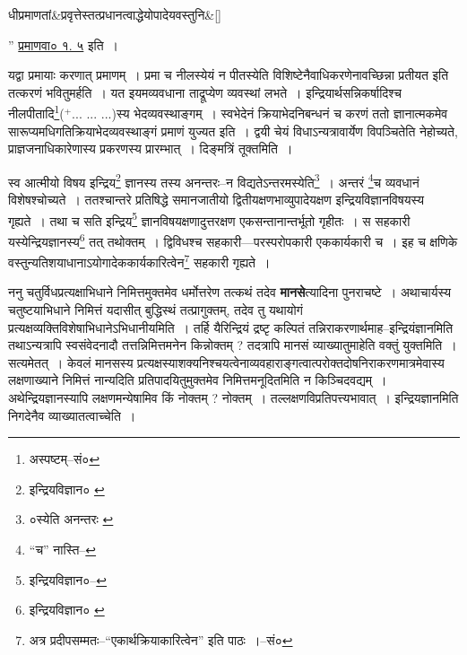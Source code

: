 \documentclass[article,12pt,a4paper]{memoir}
\newcommand{\add}[1]{($^{+}$#1)}
\begin{document}
	    
	    \stanza[\smallbreak]
	धीप्रमाणतां&प्रवृत्तेस्तत्प्रधानत्वाद्धेयोपादेयवस्तुनि\&[\smallbreak]


	
	    \pstart
	  ” \href{http://http://sarit.indology.info/?cref=pv.1.5}{प्रमाणवा० १. ५} इति ।
	\pend
      

	  \pstart यद्वा प्रमायाः करणात् प्रमाणम् । प्रमा च नीलस्येयं न पीतस्येति विशिष्टेनैवाधिकरणेनावच्छिन्ना प्रतीयत इति तत्करणं भवितुमर्हति । यत इयमव्यवधाना ताद्रूप्येण व्यवस्थां लभते । इन्द्रियार्थसन्निकर्षादिश्च नीलपीतादि\footnote{अस्पष्टम्--सं०}\add{... ... ...}स्य भेदव्यवस्थाङ्गम् । स्वभेदेनं क्रियाभेदनिबन्धनं च करणं ततो ज्ञानात्मकमेव सारूप्यमधिगतिक्रियाभेदव्यवस्थाङ्गं प्रमाणं युज्यत इति । द्वयी चेयं विधाऽन्यत्रावार्येण विपञ्चितेति नेहोच्यते, प्राज्ञजनाधिकारेणास्य प्रकरणस्य प्रारम्भात् । दिङ्मत्रिं तूक्तमिति ।
	\pend
	  \bigskip
	  \begingroup
	

	  \pstart स्व आत्मीयो विषय इन्द्रिय\footnote{इन्द्रियविज्ञान० \cite{dp-msB}} ज्ञानस्य तस्य अनन्तरः--न विद्यतेऽन्तरमस्येति\footnote{०स्येति अनन्तरः \cite{dp-msB} \cite{dp-msD}} । अन्तरं \footnote{“च” नास्ति--\cite{dp-msC}}\-च व्यवधानं विशेषश्चोच्यते । ततश्चान्तरे प्रतिषिद्धे समानजातीयो द्वितीयक्षणभाव्युपादेयक्षण इन्द्रियविज्ञानविषयस्य गृह्यते । तथा च सति इन्द्रिय\footnote{इन्द्रियविज्ञान०--\cite{dp-msC}} ज्ञानविषयक्षणादुत्तरक्षण एकसन्तानान्तर्भूतो गृहीतः । स सहकारी यस्येन्द्रियज्ञानस्य\footnote{इन्द्रियविज्ञान० \cite{dp-msA} \cite{dp-msB} \cite{dp-msD} \cite{dp-edP} \cite{dp-edH} \cite{dp-edE} \cite{dp-edN}} तत् तथोक्तम् । द्विविधश्च सहकारी—परस्परोपकारी एककार्यकारी च । इह च क्षणिके वस्तुन्यतिशयाधानाऽयोगादेककार्यकारित्वेन\footnote{अत्र प्रदीपसम्मतः--“एकार्थक्रियाकारित्वेन” इति पाठः ।--सं०} सहकारी गृह्यते ।
	\pend
      
	  \endgroup
	

	  \pstart ननु चतुर्विधप्रत्यक्षाभिधाने निमित्तमुक्तमेव धर्मोत्तरेण तत्कथं तदेव \textbf{मानसे}त्यादिना पुनराचष्टे । अथाचार्यस्य चतुष्टयाभिधाने निमित्तं यदासीत् बुद्धिस्थं तत्प्रागुक्तम्, तदेव तु यथायोगं प्रत्यक्षव्यक्तिविशेषाभिधानेऽभिधानीयमिति । तर्हि यैरिन्द्रियं द्रष्टृ कल्पितं तन्निराकरणार्थमाह--इन्द्रियंज्ञानमिति तथाऽन्यत्रापि स्वसंवेदनादौ तत्तन्निमित्तमनेन किन्नोक्तम् ? तदत्रापि मानसं व्याख्यातुमाहेति वक्तुं युक्तमिति । सत्यमेतत् । केवलं मानसस्य प्रत्यक्षस्याशक्यनिश्चयत्वेनाव्यवहाराङ्गत्वात्परोक्तदोषनिराकरणमात्रमेवास्य लक्षणाख्याने निमित्तं नान्यदिति प्रतिपादयितुमुक्तमेव निमित्तमनूदितमिति न किञ्चिदवद्यम् । अथेन्द्रियज्ञानस्यापि लक्षण\leavevmode{}मन्येषामिव किं नोक्तम् ? नोक्तम् । तल्लक्षणविप्रतिपत्त्यभावात् । इन्द्रियज्ञानमिति निगदेनैव व्याख्यातत्वाच्चेति ।
	\pend
      
\end{document}
